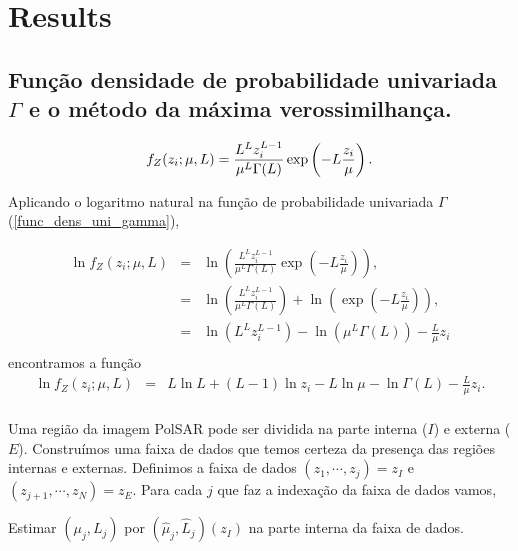 \documentclass[remotesensing,article,submit,moreauthors,pdftex]{Definitions/mdpi}
\begin{document}
\section{Results}

\subsection{Função densidade de probabilidade univariada $\Gamma$ e o método da máxima verossimilhança.}
\begin{equation}\label{func_dens_uni_gamma}
	f_{Z}(z_{i};\mu,L)=\frac{L^{L}z_{i}^{L-1}}{\mu^{L}\Gamma(L)} \exp\left(-L\frac{z_{i}}{\mu}\right). \\
\end{equation}

Aplicando o logaritmo natural na função de probabilidade univariada $\Gamma$ (\ref{func_dens_uni_gamma}),

\begin{equation}\nonumber
\begin{array}{ccc}
	\ln f_{Z}(z_{i};\mu,L)&=&\ln \left(\frac{L^{L}z_{i}^{L-1}}{\mu^{L}\Gamma(L)} \exp\left(-L\frac{z_{i}}{\mu}\right)\right), \\
	                                         &=&\ln \left(\frac{L^{L}z_{i}^{L-1}}{\mu^{L}\Gamma(L)}\right) + \ln\left(\exp\left(-L\frac{z_{i}}{\mu}\right)\right), \\
	                                         &=&\ln \left(L^{L}z_{i}^{L-1} \right)-\ln\left(\mu^{L}\Gamma(L)\right) -\frac{L}{\mu} z_i\\
\end{array}
\end{equation}
encontramos a função
\begin{equation}\label{func_max_ver_uni_gamma}
\begin{array}{ccc}
	\ln f_{Z}(z_{i};\mu,L)&=& L\ln L +(L - 1) \ln z_{i}-L \ln \mu-\ln \Gamma(L) -\frac{L}{\mu} z_i.\\
\end{array}
\end{equation}


Uma região da imagem PolSAR pode ser dividida na parte interna ($I$) e externa ($E$). Construímos uma faixa de dados que temos certeza da presença das regiões internas e externas. Definimos a faixa de dados $(z_1, \cdots,z_j)= z_I$ e $(z_{j+1}, \cdots,z_N)= z_E$. Para cada $j$ que faz a indexação da faixa de dados vamos,
  
Estimar $(\mu_j, L_j )$ por $(\hat{\mu}_j, \hat{L}_j)(z_I)$ na parte interna da faixa de dados.
\end{document}
